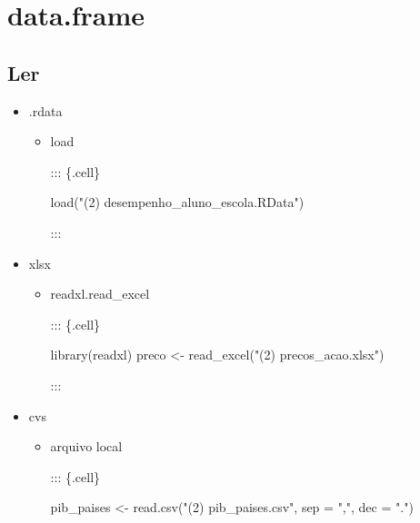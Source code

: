 \documentclass[
  letterpaper,
  DIV=11,
  numbers=noendperiod]{scrreprt}
\newenvironment{Shaded}{\begin{snugshade}}{\end{snugshade}}
\newcommand{\AttributeTok}[1]{\textcolor[rgb]{0.40,0.45,0.13}{#1}}
\newcommand{\FunctionTok}[1]{\textcolor[rgb]{0.28,0.35,0.67}{#1}}
\newcommand{\NormalTok}[1]{\textcolor[rgb]{0.00,0.23,0.31}{#1}}
\newcommand{\OtherTok}[1]{\textcolor[rgb]{0.00,0.23,0.31}{#1}}
\newcommand{\StringTok}[1]{\textcolor[rgb]{0.13,0.47,0.30}{#1}}
\providecommand{\tightlist}{%
  \setlength{\itemsep}{0pt}\setlength{\parskip}{0pt}}\usepackage{longtable,booktabs,array}
\begin{document}
\hypertarget{data.frame}{%
\section{data.frame}\label{data.frame}}

\hypertarget{ler}{%
\subsection{Ler}\label{ler}}

\begin{itemize}
\tightlist
\item
  .rdata

  \begin{itemize}
  \item
    load

    ::: \{.cell\}

\begin{Shaded}
\begin{Highlighting}[]
\FunctionTok{load}\NormalTok{(}\StringTok{"(2) desempenho\_aluno\_escola.RData"}\NormalTok{)}\StringTok{\textasciigrave{}}
\end{Highlighting}
\end{Shaded}

    :::
  \end{itemize}
\item
  xlsx

  \begin{itemize}
  \item
    readxl.read\_excel

    ::: \{.cell\}

\begin{Shaded}
\begin{Highlighting}[]
\FunctionTok{library}\NormalTok{(readxl)}
\NormalTok{preco }\OtherTok{\textless{}{-}} \FunctionTok{read\_excel}\NormalTok{(}\StringTok{"(2) precos\_acao.xlsx"}\NormalTok{) }
\end{Highlighting}
\end{Shaded}

    :::
  \end{itemize}
\item
  cvs

  \begin{itemize}
  \item
    arquivo local

    ::: \{.cell\}

\begin{Shaded}
\begin{Highlighting}[]
\NormalTok{pib\_paises }\OtherTok{\textless{}{-}} \FunctionTok{read.csv}\NormalTok{(}\StringTok{"(2) pib\_paises.csv"}\NormalTok{,}
                        \AttributeTok{sep =} \StringTok{","}\NormalTok{,}
                        \AttributeTok{dec =} \StringTok{"."}\NormalTok{)}
\end{Highlighting}
\end{Shaded}


\end{itemize}
\end{itemize}
\end{document}
